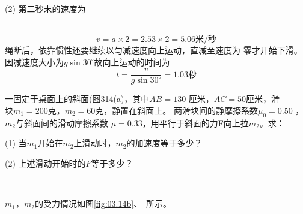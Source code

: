 (2) 第二秒末的速度为

~\vspace{-1.56em}
\begin{equation*}
	v = a \times 2 = 2 . 5 3 \times 2 = 5 . 0 6 \text{米/秒}
\end{equation*}
绳断后，依靠惯性还要继续以匀减速度向上运动，直减至速度为
零才开始下滑。因减速度大小为$  g \sin 3 0 ^ { \circ } $故向上运动的时间为
\begin{equation*}
	t = \frac { v } { g \sin 3 0 ^ { \circ } } = 1 . 0 3\text{秒}
\end{equation*}

\example 一固定于桌面上的斜面(图314(a)，其中$  A B = 1 3 0  $
厘米，$  A C = 5 0  $厘米，滑$ 块 m _ { 1 } = 2 0 0  $克，$  m _ { 2 } = 6 0  $克，静置在斜面上。
两滑块间的静摩擦系数$  \mu _ { 0 } = 0 . 5 0 $ ，$m_2$与斜面间的滑动摩擦系数
$ \mu = 0 . 3 3  $，用平行于斜面的力F向上拉$m_2$。求：

(1) 当$m_1$开始在$m_2$上滑动时，$m_2$的加速度等于多少？

(2) 上述滑动开始时的$ F $等于多少？
\begin{figurex}
	\centering
	\\[-0.5em]
	 \qquad
	\caption{}
	\label{fig:03.14}
\end{figurex}

\solution $m_1$，$m_2$的受力情况如图\ref{fig:03.14b}、~所示。

